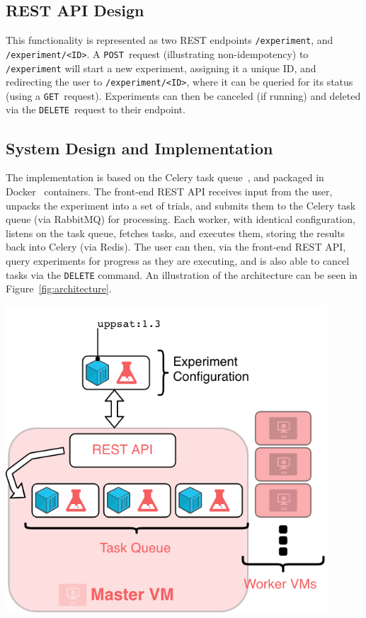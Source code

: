 \documentclass{article}
\begin{document}
\begin{multicols}{2}
\subsection*{REST API Design}

This functionality is represented as two REST endpoints \texttt{/experiment},
and \texttt{/experiment/<ID>}. A \texttt{POST}~request (illustrating
non-idempotency) to \texttt{/experiment} will start a new experiment, assigning
it a unique ID, and redirecting the user to \texttt{/experiment/<ID>}, where it
can be queried for its status (using a \texttt{GET}~request). Experiments can
then be canceled (if running) and deleted via the \texttt{DELETE}~request to
their endpoint.

\subsection*{System Design and Implementation}

The implementation is based on the Celery task queue~\cite{celery}, and packaged
in Docker~\cite{docker} containers. The front-end REST API receives input from
the user, unpacks the experiment into a set of trials, and submits them to the
Celery task queue (via RabbitMQ) for processing. Each worker, with identical
configuration, listens on the task queue, fetches tasks, and executes them,
storing the results back into Celery (via Redis). The user can then, via the
front-end REST API, query experiments for progress as they are executing, and is
also able to cancel tasks via the \texttt{DELETE} command. An illustration of
the architecture can be seen in Figure~\ref{fig:architecture}.

\begin{Figure}
  \centering
  \includegraphics[width=0.9\textwidth]{architecture}
  \label{fig:architecture}
\end{Figure}


\end{multicols}
\end{document}
